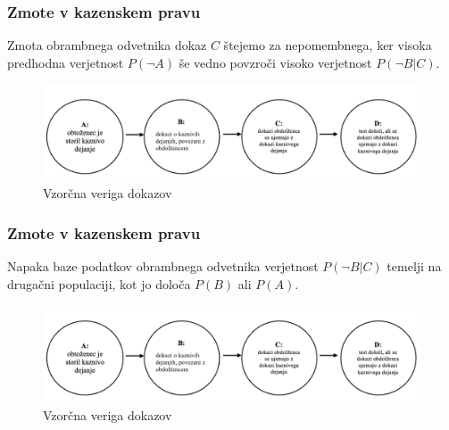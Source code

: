 \documentclass{beamer}
\begin{document}
\begin{frame}
    \frametitle{Zmote v kazenskem pravu}
    \begin{block}{Zmota obrambnega odvetnika}
        dokaz $C$ štejemo za nepomembnega, ker visoka predhodna verjetnost $P(\neg A)$ še vedno povzroči visoko verjetnost $P(\neg B \lvert C)$.    
    \end{block}
    \begin{figure}[!ht]\label{fig:slika_3}
        \centering
        \includegraphics[scale=0.50]{slika_3.png}
        \caption{Vzorčna veriga dokazov}
    \end{figure}
\end{frame}

\begin{frame}
    \frametitle{Zmote v kazenskem pravu}
    \begin{block}{Napaka baze podatkov obrambnega odvetnika}
        verjetnost $P(\neg B \lvert C)$ temelji na drugačni populaciji, kot jo določa $P(B)$ ali $P(A)$.    
    \end{block}
    \begin{figure}[!ht]\label{fig:slika_3}
        \centering
        \includegraphics[scale=0.50]{slika_3.png}
        \caption{Vzorčna veriga dokazov}
    \end{figure}
\end{frame}
\end{document}

